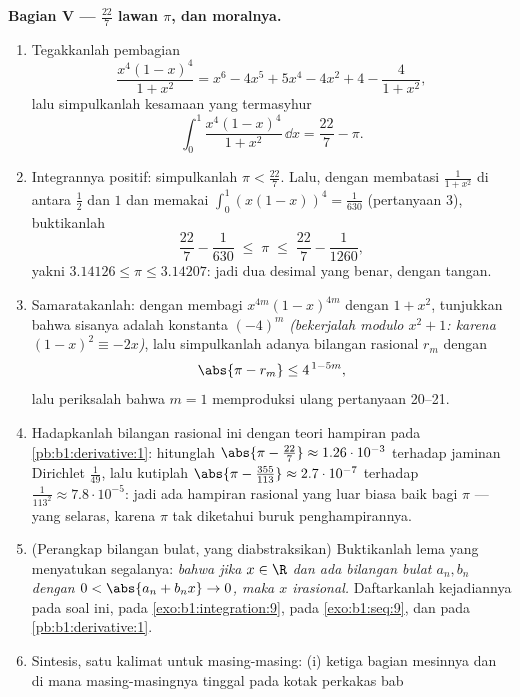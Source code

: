 \begin{problem}
\medskip
\noindent\textbf{Bagian V --- $\frac{22}{7}$ lawan $\pi$, dan
moralnya.}
\begin{enumerate}[resume]
  \item Tegakkanlah pembagian 
        \[
        \frac{x^4(1-x)^4}{1 + x^2}
        = x^6 - 4x^5 + 5x^4 - 4x^2 + 4 - \frac{4}{1 + x^2},
        \]
        lalu simpulkanlah kesamaan yang termasyhur
        \[
        \int_0^1 \frac{x^4 (1-x)^4}{1 + x^2}\,\dd x
        = \frac{22}{7} - \pi .
        \]
  \item Integrannya positif: simpulkanlah $\pi <
        \frac{22}{7}$. Lalu, dengan membatasi $\frac{1}{1+x^2}$ di antara
        $\frac12$ dan $1$ dan memakai $\int_0^1 (x(1-x))^4 =
        \frac{1}{630}$ (pertanyaan 3), buktikanlah
        \[
        \frac{22}{7} - \frac{1}{630} \;\leq\; \pi \;\leq\;
        \frac{22}{7} - \frac{1}{1260} ,
        \]
        yakni $3.14126 \leq \pi \leq 3.14207$: jadi dua desimal
        yang benar, dengan tangan.
  \item Samaratakanlah: dengan membagi $x^{4m}(1-x)^{4m}$ dengan $1 + x^2$,
        tunjukkan bahwa sisanya adalah konstanta $(-4)^m$ \emph{(bekerjalah
        modulo $x^2 + 1$: karena $(1-x)^2 \equiv -2x$)}, lalu simpulkanlah
        adanya bilangan rasional $r_m$ dengan
        \[
        \abs{\pi - r_m} \leq 4^{\,1 - 5m} ,
        \]
        lalu periksalah bahwa $m = 1$ memproduksi ulang pertanyaan 20--21.
  \item Hadapkanlah bilangan rasional ini dengan teori hampiran
        pada \cref{pb:b1:derivative:1}: hitunglah $\abs{\pi -
        \frac{22}{7}} \approx 1.26\cdot10^{-3}$ terhadap
        jaminan Dirichlet $\frac{1}{49}$, lalu kutiplah
        $\abs{\pi - \frac{355}{113}} \approx 2.7\cdot10^{-7}$
        terhadap $\frac{1}{113^2} \approx 7.8\cdot10^{-5}$:
        jadi ada hampiran rasional yang luar biasa baik bagi
        $\pi$ --- yang selaras, karena $\pi$ tak diketahui
        buruk penghampirannya.
  \item (Perangkap bilangan bulat, yang diabstraksikan) Buktikanlah lema yang
        menyatukan segalanya: \emph{bahwa jika $x \in \R$ dan ada
        bilangan bulat $a_n, b_n$ dengan $0 < \abs{a_n + b_n x} \to 0$,
        maka $x$ irasional.} Daftarkanlah kejadiannya pada soal
        ini, pada \cref{exo:b1:integration:9}, pada
        \cref{exo:b1:seq:9}, dan pada \cref{pb:b1:derivative:1}.
  \item Sintesis, satu kalimat untuk masing-masing: (i) ketiga bagian
        mesinnya dan di mana masing-masingnya tinggal pada kotak perkakas bab

\end{enumerate}
\end{problem}
